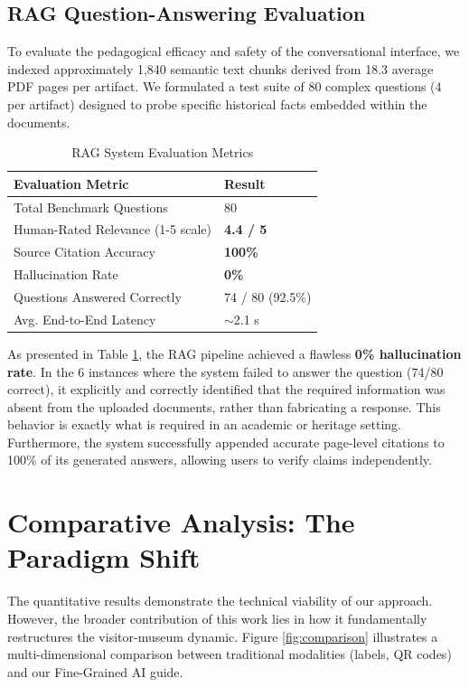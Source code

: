 \documentclass[conference]{IEEEtran}
\begin{document}
\subsection{RAG Question-Answering Evaluation}
To evaluate the pedagogical efficacy and safety of the conversational interface, we indexed approximately 1,840 semantic text chunks derived from 18.3 average PDF pages per artifact. We formulated a test suite of 80 complex questions (4 per artifact) designed to probe specific historical facts embedded within the documents.

\begin{table}[htbp]
\caption{RAG System Evaluation Metrics}
\begin{center}
\begin{tabular}{@{}ll@{}}
\toprule
\textbf{Evaluation Metric} & \textbf{Result} \\
\midrule
Total Benchmark Questions & 80 \\
Human-Rated Relevance (1-5 scale) & \textbf{4.4 / 5} \\
Source Citation Accuracy & \textbf{100\%} \\
Hallucination Rate & \textbf{0\%} \\
Questions Answered Correctly & 74 / 80 (92.5\%) \\
Avg. End-to-End Latency & $\sim$2.1 s \\
\bottomrule
\end{tabular}
\label{tab:rag_stats}
\end{center}
\end{table}

As presented in Table \ref{tab:rag_stats}, the RAG pipeline achieved a flawless \textbf{0\% hallucination rate}. In the 6 instances where the system failed to answer the question (74/80 correct), it explicitly and correctly identified that the required information was absent from the uploaded documents, rather than fabricating a response. This behavior is exactly what is required in an academic or heritage setting. Furthermore, the system successfully appended accurate page-level citations to 100\% of its generated answers, allowing users to verify claims independently.

\section{Comparative Analysis: The Paradigm Shift}
The quantitative results demonstrate the technical viability of our approach. However, the broader contribution of this work lies in how it fundamentally restructures the visitor-museum dynamic. Figure \ref{fig:comparison} illustrates a multi-dimensional comparison between traditional modalities (labels, QR codes) and our Fine-Grained AI guide.
\end{document}
